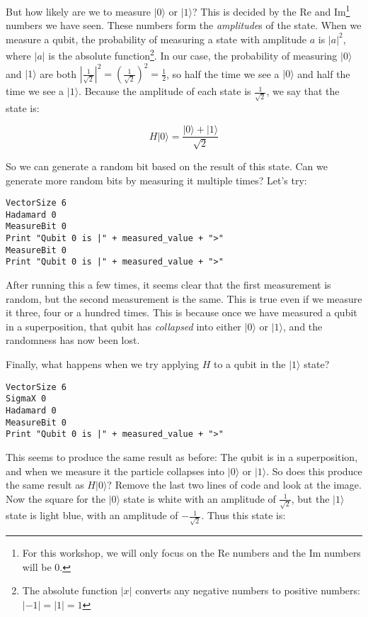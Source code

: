 \documentclass[twocolumn]{article}
\begin{document}
But how likely are we to measure $|0\rangle$ or $|1\rangle$? This is decided by the Re and Im\footnote{For this workshop, we will only focus on the Re numbers and the Im numbers will be $0$.} numbers we have seen. These numbers form the {\em amplitude}s of the state. When we measure a qubit, the probability of measuring a state with amplitude $a$ is $|a|^2$, where $|a|$ is the absolute function\footnote{The absolute function $|x|$ converts any negative numbers to positive numbers: $|-1| = |1| = 1$}. In our case, the probability of measuring $|0\rangle$ and $|1\rangle$ are both $|\frac{1}{\sqrt{2}}|^2 = (\frac{1}{\sqrt{2}})^2 = \frac{1}{2}$, so half the time we see a $|0\rangle$ and half the time we see a $|1\rangle$. Because the amplitude of each state is $\frac{1}{\sqrt{2}}$, we say that the state is:

$$H|0\rangle = \frac{|0\rangle + |1\rangle}{\sqrt{2}}$$

So we can generate a random bit based on the result of this state. Can we generate more random bits by measuring it multiple times? Let's try:

\begin{lstlisting}
VectorSize 6
Hadamard 0
MeasureBit 0
Print "Qubit 0 is |" + measured_value + ">"
MeasureBit 0
Print "Qubit 0 is |" + measured_value + ">"
\end{lstlisting}

After running this a few times, it seems clear that the first measurement is random, but the second measurement is the same. This is true even if we measure it three, four or a hundred times. This is because once we have measured a qubit in a superposition, that qubit has {\em collapsed} into either $|0\rangle$ or $|1\rangle$, and the randomness has now been lost.

Finally, what happens when we try applying $H$ to a qubit in the $|1\rangle$ state?

\begin{lstlisting}
VectorSize 6
SigmaX 0
Hadamard 0
MeasureBit 0
Print "Qubit 0 is |" + measured_value + ">"
\end{lstlisting}

This seems to produce the same result as before: The qubit is in a superposition, and when we measure it the particle collapses into $|0\rangle$ or $|1\rangle$. So does this produce the same result as $H|0\rangle$? Remove the last two lines of code and look at the image. Now the square for the $|0\rangle$ state is white with an amplitude of $\frac{1}{\sqrt{2}}$, but the $|1\rangle$ state is light blue, with an amplitude of $-\frac{1}{\sqrt{2}}$. Thus this state is:
\end{document}
